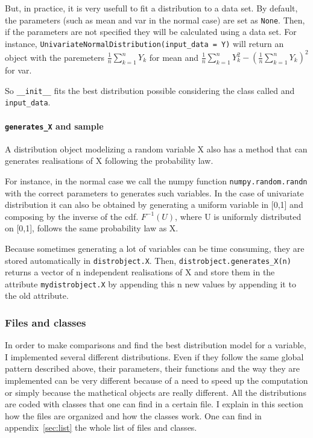 \documentclass{article}
\begin{document}
	But, in practice, it is very usefull to fit a distribution to a data set. By default, the parameters (such as mean and var in the normal case) are set as \texttt{None}. Then, if the parameters are not specified they will be calculated using a data set. For instance, \texttt{UnivariateNormalDistribution(input\_data = Y)} will return an object with the paremeters \newline $\frac{1}{n}\sum_{k=1}^n Y_k$ for mean and $\frac{1}{n}\sum_{k=1}^n Y_k^2 - (\frac{1}{n}\sum_{k=1}^n Y_k)^2$ for var.

	So \texttt{\_\_init\_\_} fits the best distribution possible considering the class called and \texttt{input\_data}.
	
	\paragraph{\texttt{generates\_X} and sample}
	
	A distribution object modelizing a random variable X also has a method that can generates realisations of X following the probability law.
	
	For instance, in the normal case we call the numpy function \texttt{numpy.random.randn} with the correct parameters to generates such variables. In the case of univariate distribution it can also be obtained by generating a uniform variable in [0,1] and composing by the inverse of the cdf. $F^{-1}(U)$, where U is uniformly distributed on [0,1], follows the same probability law as X.
	
	Because sometimes generating a lot of variables can be time consuming, they are stored automatically in \texttt{distrobject.X}. Then,  \texttt{distrobject.generates\_X(n)} returns a vector of n independent realisations of X and store them in the attribute \texttt{mydistrobject.X} by appending this n new values by appending it to the old attribute. 
	
	 
	 \subsubsection{Files and classes}
	 
	 In order to make comparisons and find the best distribution model for a variable, I implemented several different distributions. Even if they follow the same global pattern described above, their parameters, their functions and the way they are implemented can be very different because of a need to speed up the computation or simply because the mathetical objects are really different. All the distributions are coded with classes that one can find in a certain file. I explain in this section how the files are organized and how the classes work. One can find in appendix~\ref{sec:list} the whole list of files and classes.
	 
\end{document}

